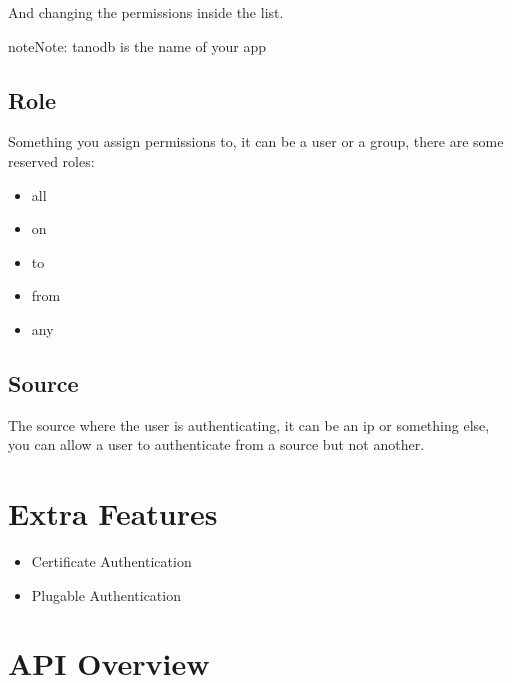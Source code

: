 \documentclass[letterpaper,10pt,english]{sphinxmanual}
\begin{document}
And changing the permissions inside the list.

\begin{notice}{note}{Note:}
tanodb is the name of your app
\end{notice}


\subsection{Role}
\label{riak_core_security:role}
Something you assign permissions to, it can be a user or a group, there are
some reserved roles:
\begin{itemize}
\item {} 
all

\item {} 
on

\item {} 
to

\item {} 
from

\item {} 
any

\end{itemize}


\subsection{Source}
\label{riak_core_security:source}
The source where the user is authenticating, it can be an ip or something else,
you can allow a user to authenticate from a source but not another.


\section{Extra Features}
\label{riak_core_security:extra-features}\begin{itemize}
\item {} 
Certificate Authentication

\item {} 
Plugable Authentication

\end{itemize}


\section{API Overview}
\label{riak_core_security:api-overview}
\end{document}
